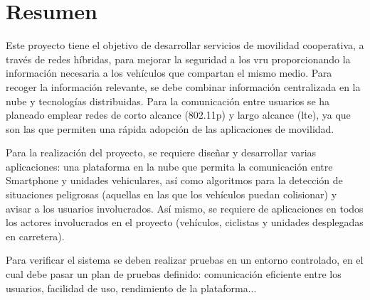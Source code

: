 \chapter*{Resumen}
Este proyecto tiene el objetivo de desarrollar servicios de movilidad cooperativa, a través de redes híbridas, para mejorar la seguridad a los \gls{vru} proporcionando la información necesaria a los vehículos que compartan el mismo medio. Para recoger la información relevante, se debe combinar información centralizada en la nube y tecnologías distribuidas. Para la comunicación entre usuarios se ha planeado emplear redes de corto alcance (\Gls{802.11p}) y largo alcance (\gls{lte}), ya que son las que permiten una rápida adopción de las aplicaciones de movilidad.

Para la realización del proyecto, se requiere diseñar y desarrollar varias aplicaciones: una plataforma en la nube que permita la comunicación entre Smartphone y unidades vehiculares, así como algoritmos para la detección de situaciones peligrosas (aquellas en las que los vehículos puedan colisionar) y avisar a los usuarios involucrados. Así mismo, se requiere de aplicaciones en todos los actores involucrados en el proyecto (vehículos, ciclistas y unidades desplegadas en carretera). 

Para verificar el sistema se deben realizar pruebas en un entorno controlado, en el cual debe pasar un plan de pruebas definido: comunicación eficiente entre los usuarios, facilidad de uso, rendimiento de la plataforma...



